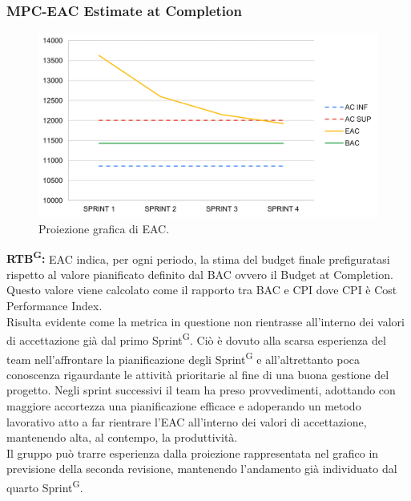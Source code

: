 \documentclass[8pt]{article}
\newcommand{\glossterm}[1]{#1\textsuperscript{G}} %
\begin{document}
\subsubsection{MPC-EAC Estimate at Completion}
\begin{figure}[h!]
    \centering
    \includegraphics[width=1\textwidth]{images/EAC.png}
    \caption{Proiezione grafica di EAC.}
    \label{fig:Proiezione grafica di EAC}
\end{figure}
\textbf{\glossterm{RTB}:} EAC indica, per ogni periodo, la stima del budget finale prefiguratasi rispetto al valore pianificato definito dal BAC ovvero il Budget at Completion. Questo valore viene calcolato come il rapporto tra BAC e CPI dove CPI è Cost Performance Index.\\
Risulta evidente come la metrica in questione non rientrasse all'interno dei valori di accettazione già dal primo \glossterm{Sprint}. Ciò è dovuto alla scarsa esperienza del team nell'affrontare la pianificazione degli \glossterm{Sprint} e all'altrettanto poca conoscenza rigaurdante le attività prioritarie al fine di una buona gestione del progetto. Negli sprint successivi il team ha preso provvedimenti, adottando con maggiore accortezza una pianificazione efficace e adoperando un metodo lavorativo atto a far rientrare l'EAC all'interno dei valori di accettazione, mantenendo alta, al contempo, la produttività.\\
Il gruppo può trarre esperienza dalla proiezione rappresentata nel grafico in previsione della seconda revisione, mantenendo l'andamento già individuato dal quarto \glossterm{Sprint}.
\clearpage
\end{document}

